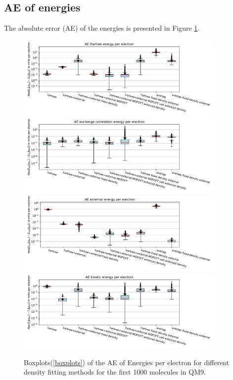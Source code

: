 \subsection{AE of energies}
The absolute error (AE) of the energies is presented in Figure
\ref{fig:AE_energies}.
\begin{figure}
    \centering
    \includegraphics[width=0.9\textwidth]{chapters/results/results_images/AE_hartree_energy_on_even_tempered_2.5_for_different_df_methods}
    \includegraphics[width=0.9\textwidth]{chapters/results/results_images/AE_xc_energy_on_even_tempered_2.5_for_different_df_methods}
    \includegraphics[width=0.9\textwidth]{chapters/results/results_images/AE_ext_energy_on_even_tempered_2.5_for_different_df_methods}
    \includegraphics[width=0.9\textwidth]{chapters/results/results_images/AE_kin_energy_on_even_tempered_2.5_for_different_df_methods}
        \caption{Boxplots(\ref{boxplots}) of the AE of Energies per electron for different density fitting methods for the first 1000 molecules in QM9.}
    \label{fig:AE_energies}
\end{figure}
